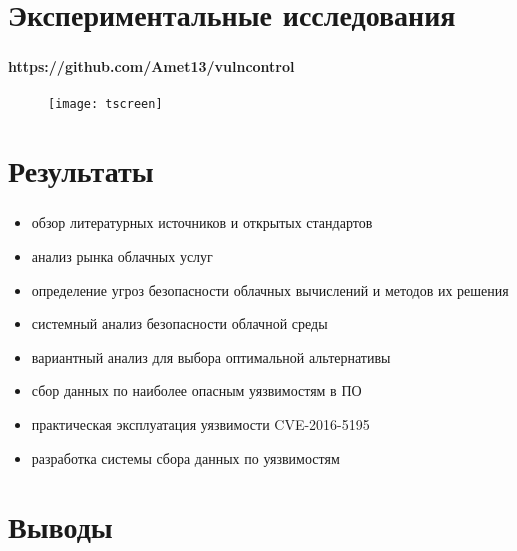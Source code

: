 \section{Экспериментальные исследования}

\begin{frame}
\frametitle{\insertsection}
\framesubtitle{https://github.com/Amet13/vulncontrol}

\begin{figure}
    \center
    \texttt{[image: tscreen]}
\end{figure}
\end{frame}


\section{Результаты}

\begin{frame}
\frametitle{\insertsection}

\begin{itemize}
    \item обзор литературных источников и открытых стандартов
    \item анализ рынка облачных услуг
    \item определение угроз безопасности облачных вычислений и методов их решения
    \item системный анализ безопасности облачной среды
    \item вариантный анализ для выбора оптимальной альтернативы
    \item сбор данных по наиболее опасным уязвимостям в ПО
    \item практическая эксплуатация уязвимости CVE-2016-5195
    \item разработка системы сбора данных по уязвимостям
\end{itemize}
\end{frame}


\section{Выводы}

